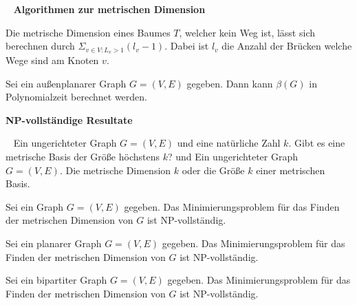 ~\newline
\textbf{Algorithmen zur metrischen Dimension}
\begin{lem}\cite{landmarks} 
\label{baum}
Die metrische Dimension eines Baumes $T$, welcher kein Weg ist, lässt sich berechnen durch $\Sigma_{v \in V:L_v >1} (l_v-1)$. Dabei ist $l_v$ die Anzahl der Brücken welche Wege sind am Knoten $v$.
\end{lem}
\begin{lem}\cite{aussenplanar}
Sei ein außenplanarer Graph $G=(V,E)$ gegeben. Dann kann $\beta(G)$ in Polynomialzeit berechnet werden.
\end{lem}
\textbf{NP-vollständige Resultate}
\begin{defi}~\newline
\vspace{-7mm}
{Ein ungerichteter Graph $G=(V,E)$ und eine natürliche Zahl $k$.}
{Gibt es eine metrische Basis der Größe höchstens $k$?}
\vspace{-2mm}
\centering und
\newpage
{}
{Ein ungerichteter Graph $G=(V,E)$.}
{Die metrische Dimension $k$ oder die Größe $k$ einer metrischen Basis.}
\end{defi}
\begin{lem}\cite{book,landmarks}
Sei ein Graph $G=(V,E)$ gegeben. Das Minimierungsproblem für das Finden der metrischen Dimension von $G$ ist NP-vollständig.
\end{lem}
\begin{lem}\cite{aussenplanar}
Sei ein planarer Graph $G=(V,E)$ gegeben. Das Minimierungsproblem für das Finden der metrischen Dimension von $G$ ist NP-vollständig.
\end{lem}
\begin{lem}\cite{bipartitnp}
Sei ein bipartiter Graph $G=(V,E)$ gegeben. Das Minimierungsproblem für das Finden der metrischen Dimension von $G$ ist NP-vollständig.
\end{lem}
